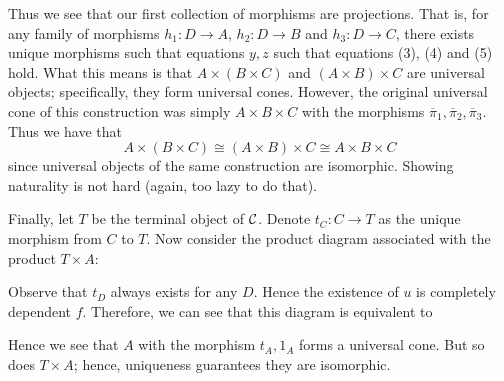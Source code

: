 \begin{prf}
\begin{description}
        Thus we see that our  first collection of morphisms are 
        projections. That is, for any family of morphisms $h_1: D \to
        A$, $h_2: D \to B$ and $h_3: D \to C$, there exists unique
        morphisms such that equations $y, z$ such that equations (3),
        (4) and (5) hold. 
        What this means is that $A \times  (B \times C)$ and $(A
        \times B) \times C$ are universal objects; specifically, they
        form universal cones. However, the original 
        universal cone of this construction was simply $A \times B 
        \times C$ with the morphisms $\overline{\pi}_1,
        \overline{\pi}_2, \overline{\pi}_3$. Thus we have that
        \[
            A \times (B \times C) \cong (A \times B) \times C \cong A 
            \times B \times C
        \]
        since universal objects of the same construction are
        isomorphic. Showing naturality is not hard (again, too lazy to
        do that).
        
        Finally, let $T$ be the terminal object of $\mathcal{C}$. Denote $t_C:
        C \to T$ as the unique morphism from $C$ to $T$. Now consider
        the product diagram associated with the product $T \times A$: 
        \begin{center}
        \end{center}
        Observe that $t_D$ always exists for any $D$. Hence the
        existence of  $u$ is completely dependent $f$. Therefore, we
        can see that this diagram is equivalent  to 
        \begin{center}
        \end{center}
        Hence we see that $A$ with the morphism $t_A, 1_A$ forms a
        universal cone. But so does $T \times A$; hence, uniqueness
        guarantees they are isomorphic. 
    \end{description}
\end{prf}

